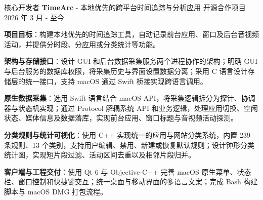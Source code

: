 \begin{cventries}
  \cventry
  {核心开发者} %
  {\textbf{TimeArc} - 本地优先的跨平台时间追踪与分析应用} %
  {开源合作项目} %
  {2026 年 3 月 - 至今} %
  {
    \begin{cvitems} %
      \item {\textbf{项目目标}：构建本地优先的时间追踪工具，自动记录前台应用、窗口及后台音视频活动，并提供分时段、分应用或分类统计等功能。}
      \item {\textbf{架构与存储接口}：设计 GUI 和后台数据采集服务两个进程协作的架构；明确 GUI 与后台服务的数据库权限，将采集历史与界面设置数据分离；采用 C 语言设计存储层的统一接口，支持 macOS 通过 Swift 桥接实现跨语言调用。}
      \item {\textbf{原生数据采集}：选用 Swift 语言结合 macOS API，将采集逻辑拆分为探针、协调器与状态机实现；通过 Protocol 解耦系统 API 和业务逻辑，处理应用切换、空闲状态、媒体信息及数据落库，实现前台应用、窗口标题与音视频活动探测。}
      \item {\textbf{分类规则与统计可视化}：使用 C++ 实现统一的应用与网站分类系统，内置 239 条规则、13 个类别，支持用户编辑、禁用、新建或恢复默认规则；设计钟形分类统计图，实现短片段过滤、活动区间去重以及相邻片段归并。}
      \item {\textbf{客户端与工程交付}：使用 Qt 6 与 Objective-C++ 完善 macOS 原生菜单、状态栏、窗口控制和快捷键交互；统一桌面与移动界面的多语言文案；完成 Bash 构建脚本与 macOS DMG 打包流程。}
    \end{cvitems}
  }

\end{cventries}
